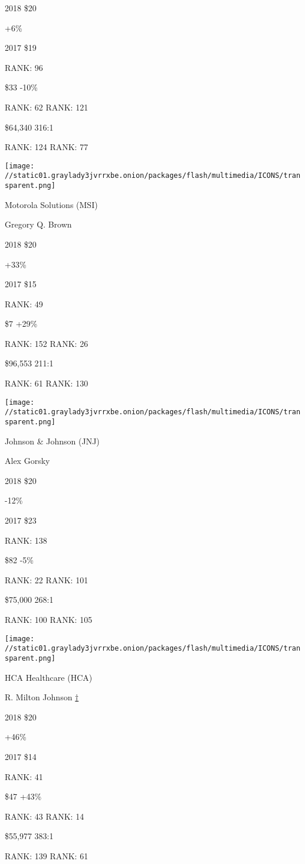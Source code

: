 2018 \$20

 +6\%

2017 \$19

RANK: 96

 \$33 -10\%

RANK: 62 RANK: 121

 \$64,340 316:1

RANK: 124 RANK: 77

\texttt{[image: //static01.graylady3jvrrxbe.onion/packages/flash/multimedia/ICONS/transparent.png]}

Motorola Solutions (MSI)

Gregory Q. Brown \protect\hyperlink{g-footnotes}{}

2018 \$20

 +33\%

2017 \$15

RANK: 49

 \$7 +29\%

RANK: 152 RANK: 26

 \$96,553 211:1

RANK: 61 RANK: 130

\texttt{[image: //static01.graylady3jvrrxbe.onion/packages/flash/multimedia/ICONS/transparent.png]}

Johnson \& Johnson (JNJ)

Alex Gorsky \protect\hyperlink{g-footnotes}{}

2018 \$20

 -12\%

2017 \$23

RANK: 138

 \$82 -5\%

RANK: 22 RANK: 101

 \$75,000 268:1

RANK: 100 RANK: 105

\texttt{[image: //static01.graylady3jvrrxbe.onion/packages/flash/multimedia/ICONS/transparent.png]}

HCA Healthcare (HCA)

R. Milton Johnson \protect\hyperlink{g-footnotes}{†}

2018 \$20

 +46\%

2017 \$14

RANK: 41

 \$47 +43\%

RANK: 43 RANK: 14

 \$55,977 383:1

RANK: 139 RANK: 61

